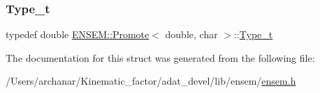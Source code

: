 \subsubsection{\texorpdfstring{Type\_t}{Type\_t}\hspace{0.1cm}{\footnotesize\ttfamily [2/2]}}
{\footnotesize\ttfamily typedef double \mbox{\hyperlink{structENSEM_1_1Promote}{E\+N\+S\+E\+M\+::\+Promote}}$<$ double, char $>$\+::\mbox{\hyperlink{structENSEM_1_1Promote_3_01double_00_01char_01_4_aa50bd72d8e60a859d481548688596791}{Type\+\_\+t}}}



The documentation for this struct was generated from the following file\+:\begin{DoxyCompactItemize}
\item 
/\+Users/archanar/\+Kinematic\+\_\+factor/adat\+\_\+devel/lib/ensem/\mbox{\hyperlink{lib_2ensem_2ensem_8h}{ensem.\+h}}\end{DoxyCompactItemize}
